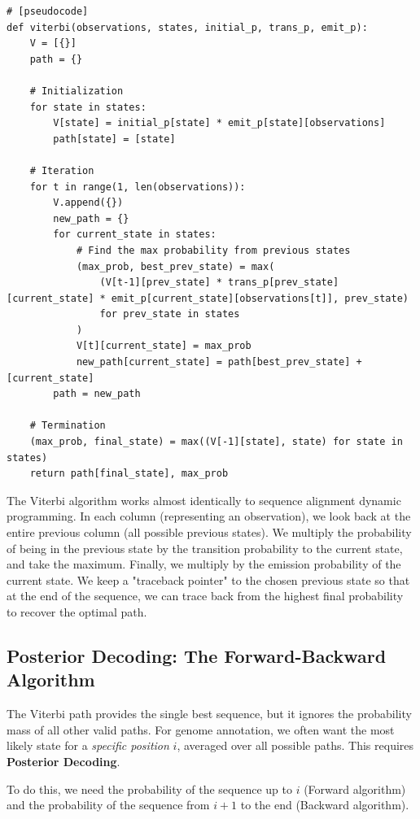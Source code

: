 \begin{verbatim}
# [pseudocode]
def viterbi(observations, states, initial_p, trans_p, emit_p):
    V = [{}]
    path = {}
    
    # Initialization
    for state in states:
        V[state] = initial_p[state] * emit_p[state][observations]
        path[state] = [state]
        
    # Iteration
    for t in range(1, len(observations)):
        V.append({})
        new_path = {}
        for current_state in states:
            # Find the max probability from previous states
            (max_prob, best_prev_state) = max(
                (V[t-1][prev_state] * trans_p[prev_state][current_state] * emit_p[current_state][observations[t]], prev_state)
                for prev_state in states
            )
            V[t][current_state] = max_prob
            new_path[current_state] = path[best_prev_state] + [current_state]
        path = new_path
        
    # Termination
    (max_prob, final_state) = max((V[-1][state], state) for state in states)
    return path[final_state], max_prob
\end{verbatim}

The Viterbi algorithm works almost identically to sequence alignment dynamic programming. In each column (representing an observation), we look back at the entire previous column (all possible previous states). We multiply the probability of being in the previous state by the transition probability to the current state, and take the maximum. Finally, we multiply by the emission probability of the current state. We keep a "traceback pointer" to the chosen previous state so that at the end of the sequence, we can trace back from the highest final probability to recover the optimal path.

\subsection{Posterior Decoding: The Forward-Backward Algorithm}

The Viterbi path provides the single best sequence, but it ignores the probability mass of all other valid paths. For genome annotation, we often want the most likely state for a \textit{specific position} $i$, averaged over all possible paths. This requires \textbf{Posterior Decoding}.

To do this, we need the probability of the sequence up to $i$ (Forward algorithm) and the probability of the sequence from $i+1$ to the end (Backward algorithm).

